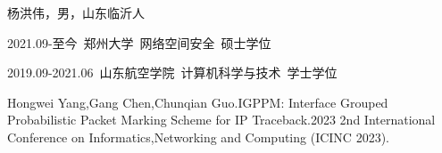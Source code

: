 \begin{resume}


  杨洪伟，男，山东临沂人
  
  2021.09-至今~郑州大学~网络空间安全~硕士学位
  
  2019.09-2021.06~山东航空学院~计算机科学与技术~学士学位


  \begin{enumerate}[{[}1{]}]
    \item Hongwei Yang,Gang Chen,Chunqian Guo.IGPPM: Interface Grouped Probabilistic Packet Marking Scheme for IP Traceback.2023 2nd International Conference on Informatics,Networking and Computing (ICINC 2023).
  \end{enumerate}

\end{resume}
